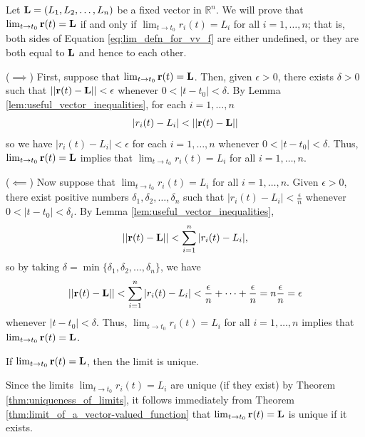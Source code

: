 \documentclass[12pt,letterpaper,reqno]{article}
\numberwithin{equation}{section}
\newcommand{\R}{\ensuremath{\mathbb R}}
\newcommand{\bl}{{\bf L}}
\newcommand{\bbr}{{\bf r}}
\begin{document}
{\begin{pf}
Let $\bl=(L_1,L_2,\dots,L_n)$ be a fixed vector in $\R^n$. We will prove that $\lim_{t \to t_0}\bbr(t)=\bl$ if and only if $\lim_{t \to t_0}r_i(t)=L_i$ for all $i=1,\dots,n$; that is, both sides of Equation \eqref{eq:lim_defn_for_vv_f} are either undefined, or they are both equal to $\bl$ and hence to each other.

($\implies$) First, suppose that $\lim_{t \to t_0}\bbr(t)=\bl$. Then, given $\epsilon>0$, there exists $\delta>0$ such that $||\bbr(t)-\bl||<\epsilon$ whenever $0<|t-t_0|<\delta$. By Lemma \ref{lem:useful_vector_inequalities}, for each $i=1,\dots,n$
\begin{align*}
	|r_i(t)-L_i|<||\bbr(t)-\bl||
\end{align*}
so we have $|r_i(t)-L_i|<\epsilon$ for each $i=1,\dots,n$ whenever $0<|t-t_0|<\delta$. Thus, $\lim_{t \to t_0}\bbr(t)=\bl$ implies that $\lim_{t \to t_0}r_i(t)=L_i$ for all $i=1,\dots,n$.

($\impliedby$) Now suppose that $\lim_{t \to t_0}r_i(t)=L_i$ for all $i=1,\dots,n$. Given $\epsilon>0$, there exist positive numbers $\delta_1,\delta_2,\dots,\delta_n$ such that $|r_i(t)-L_i|<\frac{\epsilon}{n}$ whenever $0<|t-t_0|<\delta_i$. By Lemma \ref{lem:useful_vector_inequalities}, 
\begin{align*}
	||\bbr(t)-\bl||<\sum_{i=1}^n|r_i(t)-L_i|,
\end{align*}
so by taking $\delta=\min\{\delta_1,\delta_2,\dots,\delta_n\}$, we have 
  \begin{align*}
	||\bbr(t)-\bl||<\sum_{i=1}^n|r_i(t)-L_i|<\frac{\epsilon}{n}+\cdots+\frac{\epsilon}{n}=n\frac{\epsilon}{n}=\epsilon
\end{align*}
whenever $|t-t_0|<\delta$. Thus, $\lim_{t \to t_0}r_i(t)=L_i$ for all $i=1,\dots,n$ implies that $\lim_{t \to t_0}\bbr(t)=\bl$.
\end{pf}

\begin{cor}
	If $\lim_{t \to t_0}\bbr(t)=\bl$, then the limit is unique.
\end{cor}

\begin{pf}
	Since the limits $\lim_{t \to t_0}r_i(t)=L_i$ are unique (if they exist) by Theorem \ref{thm:uniqueness_of_limits}, it follows immediately from Theorem \ref{thm:limit_of_a_vector-valued_function} that $\lim_{t \to t_0}\bbr(t)=\bl$ is unique if it exists.
\end{pf}


}
\end{document}
